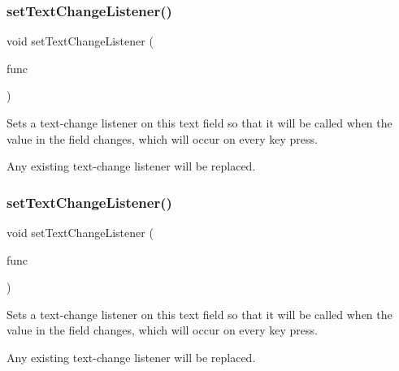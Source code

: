 \mbox{\label{classGTextField_ae41284f9c540110180ac0ad6beca5cb0}} 
\subsubsection{\texorpdfstring{set\+Text\+Change\+Listener()}{setTextChangeListener()}\hspace{0.1cm}{\footnotesize\ttfamily [1/2]}}
{\footnotesize\ttfamily void set\+Text\+Change\+Listener (\begin{DoxyParamCaption}\item[{G\+Event\+Listener}]{func }\end{DoxyParamCaption})\hspace{0.3cm}{\ttfamily [virtual]}}



Sets a text-\/change listener on this text field so that it will be called when the value in the field changes, which will occur on every key press. 

Any existing text-\/change listener will be replaced. \mbox{\label{classGTextField_ae8df75b0746951146d29220f386fcd33}} 
\subsubsection{\texorpdfstring{set\+Text\+Change\+Listener()}{setTextChangeListener()}\hspace{0.1cm}{\footnotesize\ttfamily [2/2]}}
{\footnotesize\ttfamily void set\+Text\+Change\+Listener (\begin{DoxyParamCaption}\item[{G\+Event\+Listener\+Void}]{func }\end{DoxyParamCaption})\hspace{0.3cm}{\ttfamily [virtual]}}



Sets a text-\/change listener on this text field so that it will be called when the value in the field changes, which will occur on every key press. 

Any existing text-\/change listener will be replaced. \mbox{\label{classGInteractor_a039e0e49beaecc275efce02d416acea8}} 
